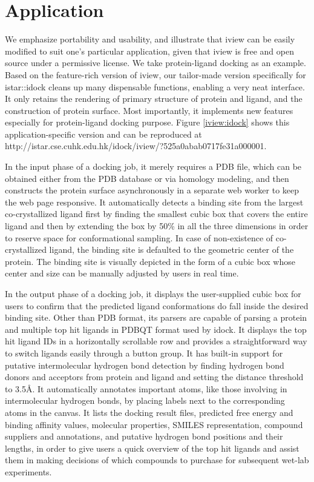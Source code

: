\section{Application}

We emphasize portability and usability, and illustrate that iview can be easily modified to suit one's particular application, given that iview is free and open source under a permissive license. We take protein-ligand docking as an example. Based on the feature-rich version of iview, our tailor-made version specifically for istar::idock cleans up many dispensable functions, enabling a very neat interface. It only retains the rendering of primary structure of protein and ligand, and the construction of protein surface. Most importantly, it implements new features especially for protein-ligand docking purpose. Figure \ref{iview:idock} shows this application-specific version and can be reproduced at http://istar.cse.cuhk.edu.hk/idock/iview/?525a0abab0717fe31a000001.

In the input phase of a docking job, it merely requires a PDB file, which can be obtained either from the PDB database \citep{1357} or via homology modeling, and then constructs the protein surface asynchronously in a separate web worker to keep the web page responsive. It automatically detects a binding site from the largest co-crystallized ligand first by finding the smallest cubic box that covers the entire ligand and then by extending the box by 50\% in all the three dimensions in order to reserve space for conformational sampling. In case of non-existence of co-crystallized ligand, the binding site is defaulted to the geometric center of the protein. The binding site is visually depicted in the form of a cubic box whose center and size can be manually adjusted by users in real time.

In the output phase of a docking job, it displays the user-supplied cubic box for users to confirm that the predicted ligand conformations do fall inside the desired binding site. Other than PDB format, its parsers are capable of parsing a protein and multiple top hit ligands in PDBQT format used by idock. It displays the top hit ligand IDs in a horizontally scrollable row and provides a straightforward way to switch ligands easily through a button group. It has built-in support for putative intermolecular hydrogen bond detection by finding hydrogen bond donors and acceptors from protein and ligand and setting the distance threshold to 3.5\AA. It automatically annotates important atoms, like those involving in intermolecular hydrogen bonds, by placing labels next to the corresponding atoms in the canvas. It lists the docking result files, predicted free energy and binding affinity values, molecular properties, SMILES representation, compound suppliers and annotations, and putative hydrogen bond positions and their lengths, in order to give users a quick overview of the top hit ligands and assist them in making decisions of which compounds to purchase for subsequent wet-lab experiments.

